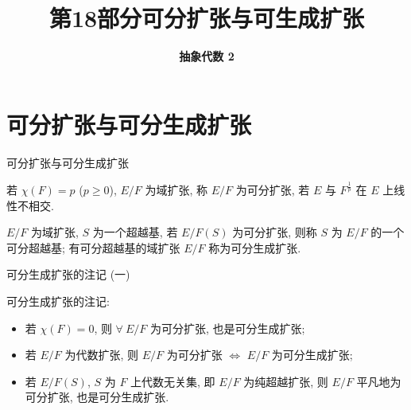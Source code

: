 \everymath{\displaystyle}



\title[可分扩张与可生成扩张]{\texorpdfstring{\LARGE \bfseries 第18部分\quad 可分扩张与可生成扩张}{第18部分 可分扩张与可生成扩张}}
\author[抽象代数 2]{\Large \bfseries 抽象代数 2}
\date{}





\begin{frame}

\titlepage %

\end{frame}


\section[定义]{可分扩张与可分生成扩张}


\begin{frame}{可分扩张与可分生成扩张}

\begin{Def}[可分扩张]
若 $\chi(F) = p$ ($p \geq 0$), $E/F$ 为域扩张,
称 $E/F$ 为可分扩张, 若 $E$ 与 $F^{\frac{1}{p}}$ 在 $E$ 上线性不相交.
\end{Def}

\pause

\begin{Def}[可分超越基与可分生成扩张]
$E/F$ 为域扩张, $S$ 为一个超越基, 若 $E/F(S)$ 为可分扩张, 则称 $S$ 为
$E/F$ 的一个可分超越基; 有可分超越基的域扩张 $E/F$ 称为可分生成扩张.
\end{Def}

\end{frame}


\begin{frame}{可分生成扩张的注记 (一)}

可分生成扩张的注记:
\begin{itemize}
\item {} 若 $\chi(F) = 0$, 则 $\forall\ E/F$ 为可分扩张,
  也是可分生成扩张;
\item {} 若 $E/F$ 为代数扩张, 则 $E/F$ 为可分扩张
  $\iff$ $E/F$ 为可分生成扩张;
\item {} 若 $E/F(S)$, $S$ 为 $F$ 上代数无关集, 即 $E/F$
  为纯超越扩张, 则 $E/F$ 平凡地为可分扩张, 也是可分生成扩张.
\end{itemize}

\end{frame}

